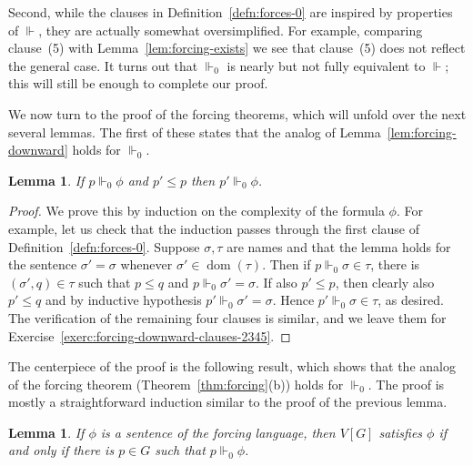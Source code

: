 \documentclass[11pt,oneside]{amsbook}
\newcommand{\forces}{\Vdash}
\DeclareMathOperator{\dom}{dom}
\theoremstyle{definition}
\theoremstyle{plain}
\newtheorem{lemma}[theorem]{Lemma}
\theoremstyle{definition}
\theoremstyle{remark}
\numberwithin{equation}{section}
\numberwithin{figure}{section}
\begin{document}
Second, while the clauses in Definition~\ref{defn:forces-0} are inspired by properties of $\forces$, they are actually somewhat oversimplified. For example, comparing clause~(5) with Lemma~\ref{lem:forcing-exists} we see that clause~(5) does not reflect the general case. It turns out that $\forces_0$ is nearly but not fully equivalent to $\forces$; this will still be enough to complete our proof.


We now turn to the proof of the forcing theorems, which will unfold over the next several lemmas. The first of these states that the analog of Lemma~\ref{lem:forcing-downward} holds for $\forces_0$.

\begin{lemma}
  \label{lem:forcing-downward-0}
  If $p\forces_0\phi$ and $p'\leq p$ then $p'\forces_0\phi$.
\end{lemma}

\begin{proof}
  We prove this by induction on the complexity of the formula $\phi$. For example, let us check that the induction passes through the first clause of Definition~\ref{defn:forces-0}. Suppose $\sigma,\tau$ are names and that the lemma holds for the sentence $\sigma'=\sigma$ whenever $\sigma'\in\dom(\tau)$. Then if $p\forces_0\sigma\in\tau$, there is $(\sigma',q)\in\tau$ such that $p\leq q$ and $p\forces_0\sigma'=\sigma$. If also $p'\leq p$, then clearly also $p'\leq q$ and by inductive hypothesis $p'\forces_0\sigma'=\sigma$. Hence $p'\forces_0\sigma\in\tau$, as desired. The verification of the remaining four clauses is similar, and we leave them for Exercise~\ref{exerc:forcing-downward-clauses-2345}.
\end{proof}

The centerpiece of the proof is the following result, which shows that the analog of the forcing theorem (Theorem~\ref{thm:forcing}(b)) holds for $\forces_0$. The proof is mostly a straightforward induction similar to the proof of the previous lemma.

\begin{lemma}
  \label{lem:forcing-theorem-0}
  If $\phi$ is a sentence of the forcing language, then $V[G]$ satisfies $\phi$ if and only if there is $p\in G$ such that $p\forces_0\phi$.
\end{lemma}
\end{document}

